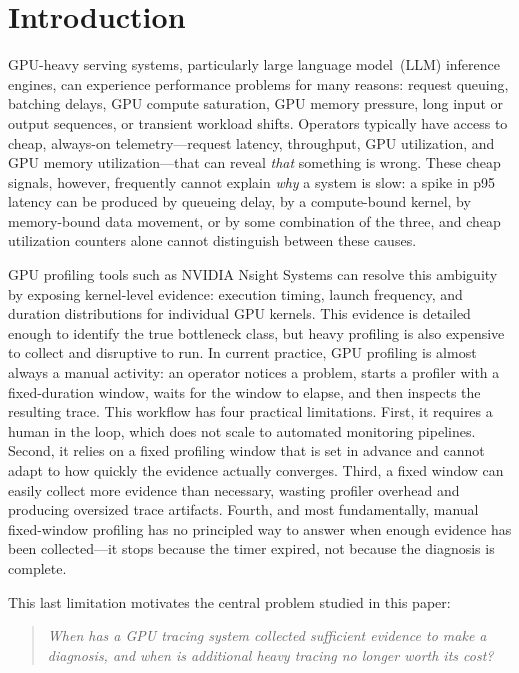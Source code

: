 \section{Introduction}

GPU-heavy serving systems, particularly large language model~(LLM) inference engines, can
experience performance problems for many reasons: request queuing, batching delays, GPU
compute saturation, GPU memory pressure, long input or output sequences, or transient
workload shifts.
Operators typically have access to cheap, always-on telemetry---request latency, throughput,
GPU utilization, and GPU memory utilization---that can reveal \emph{that} something is wrong.
These cheap signals, however, frequently cannot explain \emph{why} a system is slow: a spike
in p95 latency can be produced by queueing delay, by a compute-bound kernel, by memory-bound
data movement, or by some combination of the three, and cheap utilization counters alone
cannot distinguish between these causes.

GPU profiling tools such as NVIDIA Nsight Systems can resolve this ambiguity by exposing
kernel-level evidence: execution timing, launch frequency, and duration distributions for
individual GPU kernels.
This evidence is detailed enough to identify the true bottleneck class, but heavy profiling
is also expensive to collect and disruptive to run.
In current practice, GPU profiling is almost always a manual activity: an operator notices a
problem, starts a profiler with a fixed-duration window, waits for the window to elapse,
and then inspects the resulting trace.
This workflow has four practical limitations.
First, it requires a human in the loop, which does not scale to automated monitoring
pipelines.
Second, it relies on a fixed profiling window that is set in advance and cannot adapt to how
quickly the evidence actually converges.
Third, a fixed window can easily collect more evidence than necessary, wasting profiler
overhead and producing oversized trace artifacts.
Fourth, and most fundamentally, manual fixed-window profiling has no principled way to
answer when enough evidence has been collected---it stops because the timer expired, not
because the diagnosis is complete.

This last limitation motivates the central problem studied in this paper:

\begin{quote}
\emph{When has a GPU tracing system collected sufficient evidence to make a diagnosis, and
when is additional heavy tracing no longer worth its cost?}
\end{quote}

